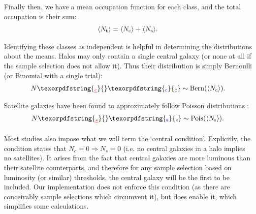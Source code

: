 \documentclass[5p,aas_macros]{elsarticle}
\newcommand{\Nc}{\langle N_{\rm c} \rangle} %
\newcommand{\Ns}{\langle N_{\rm s} \rangle} %
\newcommand{\Nt}{\langle N_{\rm t} \rangle} %
\providecommand{\DIFaddtex}[1]{{\protect\color{blue}\uwave{#1}}} %
\providecommand{\DIFdeltex}[1]{{\protect\color{red}\sout{#1}}}                      %
\providecommand{\DIFaddbegin}{} %
\providecommand{\DIFaddend}{} %
\providecommand{\DIFdelbegin}{} %
\providecommand{\DIFdelend}{} %
\providecommand{\DIFadd}[1]{\texorpdfstring{\DIFaddtex{#1}}{#1}} %
\providecommand{\DIFdel}[1]{\texorpdfstring{\DIFdeltex{#1}}{}} %
\begin{document}
Finally then, we have a mean occupation function for each class, and the total occupation is their sum:
\begin{equation}
    \Nt = \Nc + \Ns.
\end{equation}
\DIFdelbegin %

\DIFdelend Identifying these classes as independent is helpful in determining the distributions about the means. Halos may only contain a single central galaxy (or none at all if the sample selection does not allow it). Thus their distribution is simply Bernoulli (or Binomial with a single trial):
\begin{equation}
    N\DIFdelbegin \DIFdel{_c }\DIFdelend \DIFaddbegin \DIFadd{_{\rm c} }\DIFaddend \sim \text{Bern}(\Nc).
\end{equation}
Satellite galaxies have been found to approximately follow Poisson distributions \citep{Kauffmann2004,Zheng2005}:
\begin{equation}
    N\DIFdelbegin \DIFdel{_s }\DIFdelend \DIFaddbegin \DIFadd{_{\rm s} }\DIFaddend \sim \text{Pois}(\Ns).
\end{equation}

Most studies also impose what we will term the `central condition'. Explicitly, the condition states that \DIFdelbegin \DIFdel{$N_c = 0 \Rightarrow N_s = 0$ }\DIFdelend \DIFaddbegin \DIFadd{$N_{\rm c} = 0 \Rightarrow N_{\rm s} = 0$ }\DIFaddend (i.e. no central galaxies in a halo implies no satellites).
It arises from the fact that central galaxies are more luminous than their satellite counterparts, and therefore for any sample selection based on luminosity (or similar) thresholds, the central galaxy will be the first to be included.  Our implementation does not enforce this condition (as there are conceivably sample selections which circumvent it), but does enable it, which simplifies some calculations.
\end{document}
